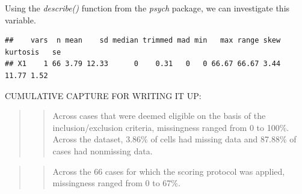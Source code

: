 \documentclass[
  11pt,
]{book}
\newenvironment{Shaded}{\begin{snugshade}}{\end{snugshade}}
\newcommand{\AttributeTok}[1]{\textcolor[rgb]{0.27,0.27,0.27}{#1}}
\newcommand{\CommentTok}[1]{\textcolor[rgb]{0.37,0.37,0.37}{\textit{#1}}}
\newcommand{\DecValTok}[1]{\textcolor[rgb]{0.06,0.06,0.06}{#1}}
\newcommand{\FunctionTok}[1]{\textcolor[rgb]{0.27,0.27,0.27}{\textbf{#1}}}
\newcommand{\NormalTok}[1]{#1}
\newcommand{\OtherTok}[1]{\textcolor[rgb]{0.37,0.37,0.37}{#1}}
\newcommand{\SpecialCharTok}[1]{\textcolor[rgb]{0.43,0.43,0.43}{\textbf{#1}}}
\begin{document}
Using the \emph{describe()} function from the \emph{psych} package, we can investigate this variable.

\begin{Shaded}
\end{Shaded}

\begin{verbatim}
##    vars  n mean    sd median trimmed mad min   max range skew kurtosis   se
## X1    1 66 3.79 12.33      0    0.31   0   0 66.67 66.67 3.44    11.77 1.52
\end{verbatim}

CUMULATIVE CAPTURE FOR WRITING IT UP:

\begin{quote}
\begin{quote}
Across cases that were deemed eligible on the basis of the inclusion/exclusion criteria, missingness ranged from 0 to 100\%. Across the dataset, 3.86\% of cells had missing data and 87.88\% of cases had nonmissing data.
\end{quote}
\end{quote}

\begin{quote}
\begin{quote}
Across the 66 cases for which the scoring protocol was applied, missingness ranged from 0 to 67\%.
\end{quote}
\end{quote}
\end{document}
